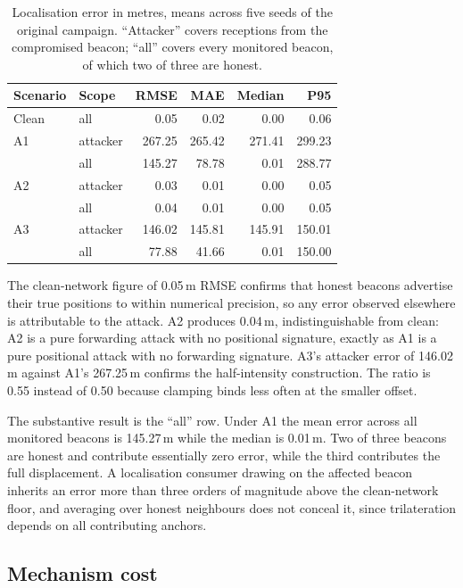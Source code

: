 \begin{table}[!t]
\caption{Localisation error in metres, means across five seeds of the original
campaign. ``Attacker'' covers receptions from the compromised beacon; ``all''
covers every monitored beacon, of which two of three are honest.}
\label{tab:locerr}
\centering
\footnotesize
\begin{tabular}{@{}llrrrr@{}}
\toprule
Scenario & Scope & RMSE & MAE & Median & P95 \\
\midrule
Clean & all & 0.05 & 0.02 & 0.00 & 0.06 \\
A1 & attacker & 267.25 & 265.42 & 271.41 & 299.23 \\
   & all & 145.27 & 78.78 & 0.01 & 288.77 \\
A2 & attacker & 0.03 & 0.01 & 0.00 & 0.05 \\
   & all & 0.04 & 0.01 & 0.00 & 0.05 \\
A3 & attacker & 146.02 & 145.81 & 145.91 & 150.01 \\
   & all & 77.88 & 41.66 & 0.01 & 150.00 \\
\bottomrule
\end{tabular}
\end{table}

The clean-network figure of 0.05\,m RMSE confirms that honest beacons advertise
their true positions to within numerical precision, so any error observed
elsewhere is attributable to the attack. A2 produces 0.04\,m, indistinguishable
from clean: A2 is a pure forwarding attack with no positional signature, exactly
as A1 is a pure positional attack with no forwarding signature. A3's attacker
error of 146.02\,m against A1's 267.25\,m confirms the half-intensity
construction. The ratio is 0.55 instead of 0.50 because clamping binds less
often at the smaller offset.

The substantive result is the ``all'' row. Under A1 the mean error across all
monitored beacons is 145.27\,m while the median is 0.01\,m. Two of three beacons
are honest and contribute essentially zero error, while the third contributes
the full displacement. A localisation consumer drawing on the affected beacon
inherits an error more than three orders of magnitude above the clean-network floor, and
averaging over honest neighbours does not conceal it, since trilateration
depends on all contributing anchors.


\subsection{Mechanism cost}

